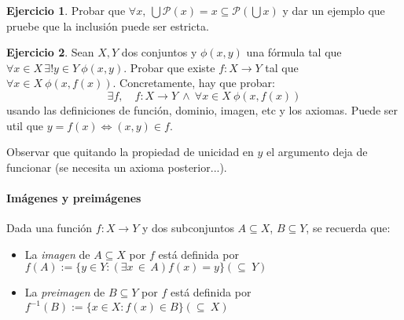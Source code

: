 \documentclass[a4paper,12pt]{book}
\newcommand{\Lra}{\Leftrightarrow}
\def\ExIn#1#2{(\exists#1\,{\in}\,#2)}
\theoremstyle{definition}
\newtheorem{ejercicio}{Ejercicio}
\begin{document}
	\begin{ejercicio}
	Probar que $\forall x,~\bigcup \mathcal{P} (x)=x\subseteq \mathcal{P} (\bigcup x)$ y dar un ejemplo que pruebe que la inclusi\'on puede ser estricta. 
	\end{ejercicio}

	\begin{ejercicio}
		Sean $X,Y$ dos conjuntos y $\phi(x,y)$ una fórmula tal que $\forall x\in X\,\exists!y\in Y~\phi(x,y)$. Probar que existe $f:X\to Y$ tal que $\forall x\in X~\phi(x,f(x))$. Concretamente, hay que probar:
		$$\exists f,\quad f:X\to Y~\wedge~\forall x\in X~\phi(x,f(x))
		$$
		usando las definiciones de función, dominio, imagen, etc y los axiomas. Puede ser util que $y=f(x)\Lra (x,y)\in f$.
		
		Observar que quitando la propiedad de unicidad en $y$ el argumento deja de funcionar (se necesita un axioma posterior...).
	\end{ejercicio}
	

	
		\paragraph*{Imágenes y preimágenes}
	Dada una función $f:X\to Y$ y dos subconjuntos
	$A\subseteq X$, $B\subseteq Y$, se recuerda que:
	\begin{itemize}\parskip-.5ex
		\item La \emph{imagen} de $A\subseteq X$ por $f$ está definida por\quad
		$f(A):=\{y\in Y:\ExIn{x}{A}f(x)=y\}$\hfill$({\subseteq}~Y)$
		\item La \emph{preimagen} de $B\subseteq Y$ por $f$ está definida por\quad
		$f^{-1}(B):=\{x\in X:f(x)\in B\}$\hfill $({\subseteq}~X)$
	\end{itemize}
	
\end{document}
